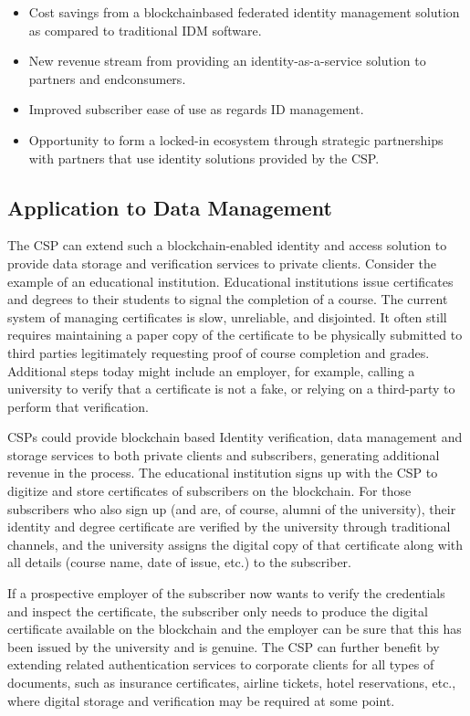 \documentclass[12pt]{article}
\begin{document}
\begin{itemize}
\item Cost savings from a blockchainbased
federated identity
management solution as
compared to traditional IDM
software.
\item New revenue stream from
providing an identity-as-a-service
solution to partners and endconsumers.
\item Improved subscriber ease of use
as regards ID management.
\item Opportunity to form a locked-in
ecosystem through strategic
partnerships with partners that
use identity solutions provided by
the CSP.

\end{itemize}
\frameboxend

\subsection{Application to Data Management}
The CSP can extend such a blockchain-enabled
identity and access solution to provide
data storage and verification services to
private clients. Consider the example of
an educational institution. Educational
institutions issue certificates and degrees
to their students to signal the completion
of a course. The current system of managing
certificates is slow, unreliable, and
disjointed. It often still requires maintaining
a paper copy of the certificate to be physically
submitted to third parties legitimately
requesting proof of course completion
and grades. Additional steps today might
include an employer, for example, calling a
university to verify that a certificate is not a
fake, or relying on a third-party to perform
that verification.

CSPs could provide blockchain based
Identity verification, data management and
storage services to both private clients and
subscribers, generating additional revenue
in the process. The educational institution
signs up with the CSP to digitize and store
certificates of subscribers on the blockchain.
For those subscribers who also sign
up (and are, of course, alumni of the university),
their identity and degree certificate are
verified by the university through traditional
channels, and the university assigns the
digital copy of that certificate along with all
details (course name, date of issue, etc.) to
the subscriber.

If a prospective employer of the subscriber
now wants to verify the credentials and
inspect the certificate, the subscriber only
needs to produce the digital certificate available
on the blockchain and the employer
can be sure that this has been issued by
the university and is genuine. The CSP can
further benefit by extending related authentication
services to corporate clients for all
types of documents, such as insurance certificates,
airline tickets, hotel reservations,
etc., where digital storage and verification
may be required at some point.
\end{document}
